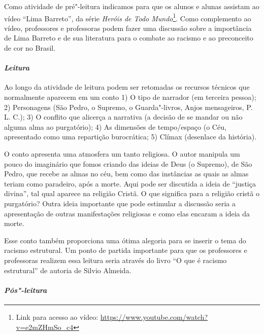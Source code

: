 \documentclass{extarticle}
\begin{document}
Como atividade de pré"-leitura indicamos para que os alunos e alunas
assistam ao vídeo ``Lima Barreto'', da série \emph{Heróis de Todo
Mundo}\footnote{Link para acesso ao vídeo:
  \url{https://www.youtube.com/watch?v=e2mZHmSo_c4}}. Como complemento
ao vídeo, professores e professoras podem fazer uma discussão sobre a
importância de Lima Barreto e de sua literatura para o combate ao
racismo e ao preconceito de cor no Brasil.

\paragraph{\textit{Leitura}}

Ao longo da atividade de leitura podem ser retomadas os recursos
técnicos que normalmente aparecem em um conto 1) O tipo de narrador (em
terceira pessoa); 2) Personagens (São Pedro, o Supremo, o Guarda"-livros,
Anjos mensageiros, P. L. C.); 3) O conflito que alicerça a narrativa (a
decisão de se mandar ou não alguma alma ao purgatório); 4) As dimensões
de tempo/espaço (o Céu, apresentado como uma repartição burocrática; 5)
Clímax (desenlace da história).

O conto apresenta uma atmosfera um tanto religiosa. O autor manipula um
pouco do imaginário que fomos criando das ideias de Deus (o Supremo), de
São Pedro, que recebe as almas no céu, bem como das instâncias as quais
as almas teriam como paradeiro, após a morte. Aqui pode ser discutida a
ideia de ``justiça divina'', tal qual aparece na religião Cristã. O que
significa para a religião cristã o purgatório? Outra ideia importante
que pode estimular a discussão seria a apresentação de outras
manifestações religiosas e como elas encaram a ideia da morte.






Esse conto também proporciona uma ótima alegoria para se inserir o tema
do racismo estrutural. Um ponto de partida importante para que os
professores e professoras realizem essa leitura seria através do livro
``O que é racismo estrutural'' de autoria de Silvio Almeida.

\paragraph{\textit{Pós"-leitura}}
\end{document}
